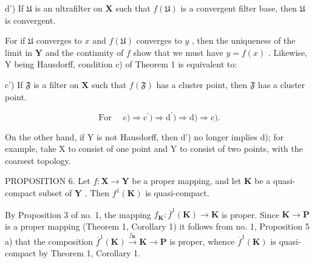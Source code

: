 d') If \(\mathfrak{U}\) is an ultrafilter on \(\mathbf{X}\) such that \(f(\mathfrak{U})\) is a convergent filter base, then \(\mathfrak{U}\) is convergent.

For if \(\mathfrak{U}\) converges to \(x\) and \(f(\mathfrak{U})\) converges to \(y\) , then the uniqueness of the limit in \(\mathbf{Y}\) and the continuity of \(f\) show that we must have \(y = f(x)\) . Likewise, Y being Hausdorff, condition c) of Theorem 1 is equivalent to:

c') If \(\mathfrak{F}\) is a filter on \(\mathbf{X}\) such that \(f(\mathfrak{F})\) has a cluster point, then \(\mathfrak{F}\) has a cluster point.

\[
\text { For } \quad \mathrm{c}) \Longrightarrow \mathrm{c} ^ {\prime}) \Longrightarrow \mathrm{d} ^ {\prime}) \Longrightarrow \mathrm{d}) \Longrightarrow \mathrm{c}).
\]

On the other hand, if Y is not Hausdorff, then d') no longer implies d); for example, take X to consist of one point and Y to consist of two points, with the coarsest topology.

PROPOSITION 6. Let \(f: \mathbf{X} \to \mathbf{Y}\) be a proper mapping, and let \(\mathbf{K}\) be a quasi-compact subset of \(\mathbf{Y}\) . Then \(f^1(\mathbf{K})\) is quasi-compact.

By Proposition 3 of no. 1, the mapping \(f_{\mathbf{K}}: \overline{f}^{1}(\mathbf{K}) \to \mathbf{K}\) is proper. Since \(\mathbf{K} \to \mathbf{P}\) is a proper mapping (Theorem 1, Corollary 1) it follows from no. 1, Proposition 5 a) that the composition \(\overline{f}^{1}(\mathbf{K}) \xrightarrow{f_{\mathbf{K}}} \mathbf{K} \to \mathbf{P}\) is proper, whence \(\overline{f}^{1}(\mathbf{K})\) is quasi-compact by Theorem 1, Corollary 1.

